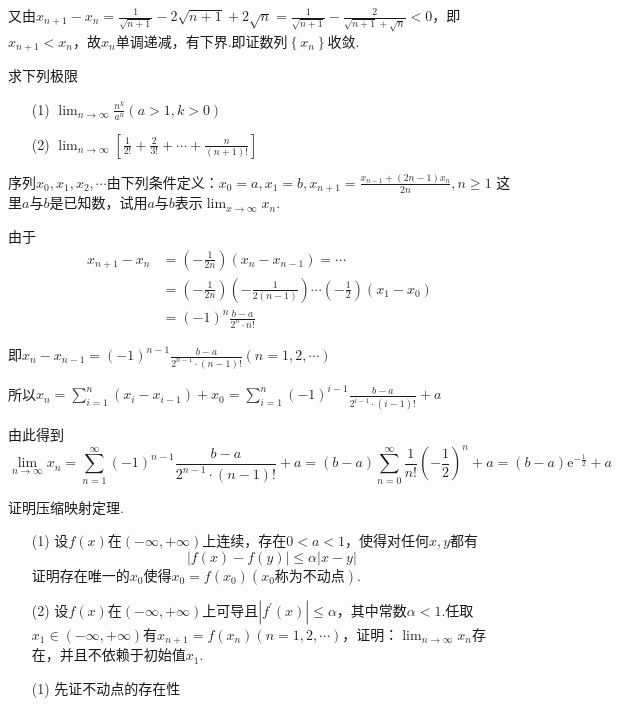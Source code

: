 \begin{xiti}
\begin{solution}
又由$x_{n+1}-x_{n}=\frac{1}{\sqrt{n+1}}-2 \sqrt{n+1}+2 \sqrt{n}=\frac{1}{\sqrt{n+1}}-\frac{2}{\sqrt{n+1}+\sqrt{n}}<0$，即$x_{n+1}<x_{n}$，故$ x_{n} $单调递减，有下界.即证数列$\left\lbrace x_{n}\right\rbrace $收敛.
\end{solution}
\item 求下列极限
\begin{enumerate}
	\item[(1)] $\lim _ { n \rightarrow \infty } \frac { n ^ { k } } { a ^ { n } } ( a > 1 , k > 0 )$
	\item[(2)] $\lim _ { n \rightarrow \infty } \left[ \frac { 1 } { 2 ! } + \frac { 2 } { 3 ! } + \cdots + \frac { n } { ( n + 1 ) ! } \right]$
\end{enumerate}
\item 序列$x _ { 0 } , x _ { 1 } , x _ { 2 } , \cdots$由下列条件定义：$x _ { 0 } = a , x _ { 1 } = b , x _ { n + 1 } = \frac { x _ { n - 1 } + ( 2 n - 1 ) x _ { n } } { 2 n } , n \geqslant 1$
\noindent 这里$a$与$b$是已知数，试用$a$与$b$表示$\lim_{ x \rightarrow \infty }x_{n}$.
\begin{solution}
	由于\begin{align*} 
	x_{n+1}-x_{n} &=\left(-\frac{1}{2 n}\right)\left(x_{n}-x_{n-1}\right)=\cdots \\ &=\left(-\frac{1}{2 n}\right)\left(-\frac{1}{2(n-1)}\right) \cdots\left(-\frac{1}{2}\right)\left(x_{1}-x_{0}\right) \\ &=(-1)^{n} \frac{b-a}{2^{n} \cdot n !} 
	\end{align*}
	
	即$x_{n}-x_{n-1}=(-1)^{n-1} \frac{b-a}{2^{n-1} \cdot(n-1) !}(n=1,2, \cdots)$
	
	所以$x_{n}=\sum_{i=1}^{n}\left(x_{i}-x_{i-1}\right)+x_{0}=\sum_{i=1}^{n}(-1)^{i-1} \frac{b-a}{2^{i-1} \cdot(i-1) !}+a$
	
	由此得到
	\[
	\lim _{n \rightarrow \infty} x_{n}=\sum_{n=1}^{\infty}(-1)^{n-1} \frac{b-a}{2^{n-1} \cdot(n-1) !}+a=(b-a) \sum_{n=0}^{\infty} \frac{1}{n !}\left(-\frac{1}{2}\right)^{n}+a=(b-a) \mathrm{e}^{-\frac{1}{2}}+a 
	\]
	
	
\end{solution}
\item 证明压缩映射定理.
\begin{enumerate}
	\item[(1)] 设$f(x)$在$(-\infty,+\infty)$上连续，存在$0<a<1$，使得对任何$x,y$都有
	\[| f ( x ) - f ( y ) | \leqslant \alpha | x - y |\]
	证明存在唯一的$x_{0}$使得$x_{0}=f(x_{0})(x_{0}\text{称为不动点})$.
	\item[(2)] 设$f(x)$在$(-\infty,+\infty)$上可导且$\left| f ^ { \prime } ( x ) \right| \leqslant \alpha$，其中常数$\alpha<1$.任取$x _ { 1 } \in ( - \infty , + \infty )$有$x _ { n + 1 } = f \left( x _ { n } \right) ( n = 1,2 , \cdots )$，证明：$\lim_{ n \rightarrow \infty }x_{n}$存在，并且不依赖于初始值$x_{1}$.
\end{enumerate}
\begin{solution}
	\begin{enumerate}
		\item[(1)] 先证不动点的存在性
		

\end{enumerate}
\end{solution}
\end{xiti}

